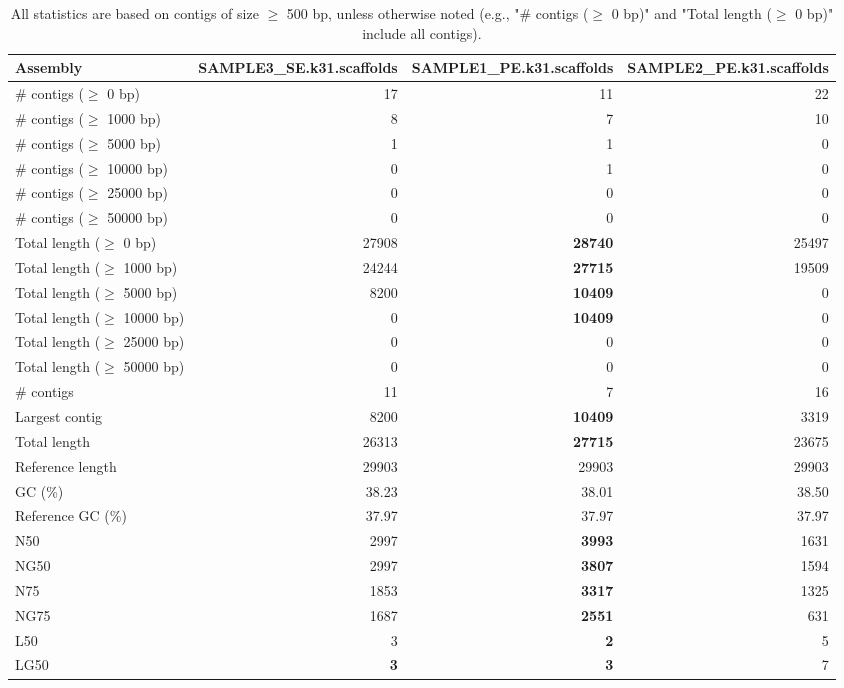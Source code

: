 \documentclass[12pt,a4paper]{article}
\begin{document}
\begin{table}[ht]
\begin{center}
\caption{All statistics are based on contigs of size $\geq$ 500 bp, unless otherwise noted (e.g., "\# contigs ($\geq$ 0 bp)" and "Total length ($\geq$ 0 bp)" include all contigs).}
\begin{tabular}{|l*{3}{|r}|}
\hline
Assembly & SAMPLE3\_SE.k31.scaffolds & SAMPLE1\_PE.k31.scaffolds & SAMPLE2\_PE.k31.scaffolds \\ \hline
\# contigs ($\geq$ 0 bp) & 17 & 11 & 22 \\ \hline
\# contigs ($\geq$ 1000 bp) & 8 & 7 & 10 \\ \hline
\# contigs ($\geq$ 5000 bp) & 1 & 1 & 0 \\ \hline
\# contigs ($\geq$ 10000 bp) & 0 & 1 & 0 \\ \hline
\# contigs ($\geq$ 25000 bp) & 0 & 0 & 0 \\ \hline
\# contigs ($\geq$ 50000 bp) & 0 & 0 & 0 \\ \hline
Total length ($\geq$ 0 bp) & 27908 & {\bf 28740} & 25497 \\ \hline
Total length ($\geq$ 1000 bp) & 24244 & {\bf 27715} & 19509 \\ \hline
Total length ($\geq$ 5000 bp) & 8200 & {\bf 10409} & 0 \\ \hline
Total length ($\geq$ 10000 bp) & 0 & {\bf 10409} & 0 \\ \hline
Total length ($\geq$ 25000 bp) & 0 & 0 & 0 \\ \hline
Total length ($\geq$ 50000 bp) & 0 & 0 & 0 \\ \hline
\# contigs & 11 & 7 & 16 \\ \hline
Largest contig & 8200 & {\bf 10409} & 3319 \\ \hline
Total length & 26313 & {\bf 27715} & 23675 \\ \hline
Reference length & 29903 & 29903 & 29903 \\ \hline
GC (\%) & 38.23 & 38.01 & 38.50 \\ \hline
Reference GC (\%) & 37.97 & 37.97 & 37.97 \\ \hline
N50 & 2997 & {\bf 3993} & 1631 \\ \hline
NG50 & 2997 & {\bf 3807} & 1594 \\ \hline
N75 & 1853 & {\bf 3317} & 1325 \\ \hline
NG75 & 1687 & {\bf 2551} & 631 \\ \hline
L50 & 3 & {\bf 2} & 5 \\ \hline
LG50 & {\bf 3} & {\bf 3} & 7 \\ \hline

\end{tabular}
\end{center}
\end{table}
\end{document}
